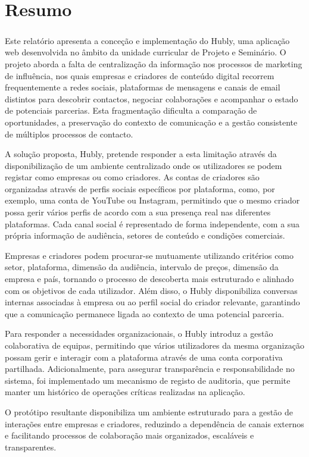 \chapter*{Resumo}
\paragraph{}Este relatório apresenta a conceção e implementação do Hubly, uma aplicação web desenvolvida no âmbito da unidade curricular de Projeto e Seminário. O projeto aborda a falta de centralização da informação nos processos de marketing de influência, nos quais empresas e criadores de conteúdo digital recorrem frequentemente a redes sociais, plataformas de mensagens e canais de email distintos para descobrir contactos, negociar colaborações e acompanhar o estado de potenciais parcerias. Esta fragmentação dificulta a comparação de oportunidades, a preservação do contexto de comunicação e a gestão consistente de múltiplos processos de contacto.

A solução proposta, Hubly, pretende responder a esta limitação através da disponibilização de um ambiente centralizado onde os utilizadores se podem registar como empresas ou como criadores. As contas de criadores são organizadas através de perfis sociais específicos por plataforma, como, por exemplo, uma conta de YouTube ou Instagram, permitindo que o mesmo criador possa gerir vários perfis de acordo com a sua presença real nas diferentes plataformas. Cada canal social é representado de forma independente, com a sua própria informação de audiência, setores de conteúdo e condições comerciais.

Empresas e criadores podem procurar-se mutuamente utilizando critérios como setor, plataforma, dimensão da audiência, intervalo de preços, dimensão da empresa e país, tornando o processo de descoberta mais estruturado e alinhado com os objetivos de cada utilizador. Além disso, o Hubly disponibiliza conversas internas associadas à empresa ou ao perfil social do criador relevante, garantindo que a comunicação permanece ligada ao contexto de uma potencial parceria.

Para responder a necessidades organizacionais, o Hubly introduz a gestão colaborativa de equipas, permitindo que vários utilizadores da mesma organização possam gerir e interagir com a plataforma através de uma conta corporativa partilhada. Adicionalmente, para assegurar transparência e responsabilidade no sistema, foi implementado um mecanismo de registo de auditoria, que permite manter um histórico de operações críticas realizadas na aplicação.

O protótipo resultante disponibiliza um ambiente estruturado para a gestão de interações entre empresas e criadores, reduzindo a dependência de canais externos e facilitando processos de colaboração mais organizados, escaláveis e transparentes.